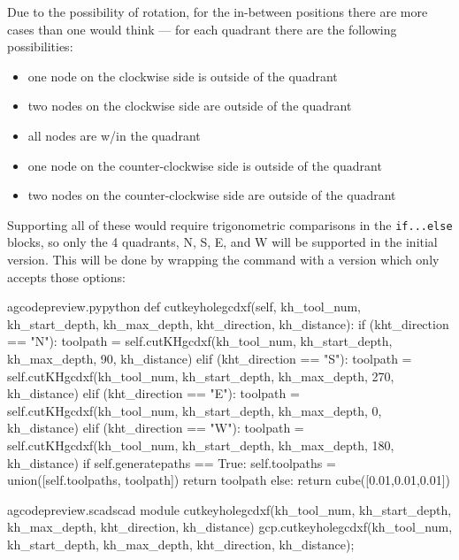 \documentclass{ltxdoc}
\begin{document}
Due to the possibility of rotation, for the in-between positions there are more cases than one would think --- for each quadrant there are the following possibilities:

\begin{itemize}
 \item one node on the clockwise side is outside of the quadrant
 \item two nodes on the clockwise side are outside of the quadrant
 \item all nodes are w/in the quadrant
 \item one node on the counter-clockwise side is outside of the quadrant
 \item two nodes on the counter-clockwise side are outside of the quadrant
\end{itemize}
 
Supporting all of these would require trigonometric comparisons in the \verb|if...else| blocks, so only the 4 quadrants, N, S, E, and W will be supported in the initial version. This will be done by wrapping the command with a version which only accepts those options: 

\lstset{firstnumber=\thegcpy}
\begin{writecode}{a}{gcodepreview.py}{python}
    def cutkeyholegcdxf(self, kh_tool_num, kh_start_depth, kh_max_depth, kht_direction, kh_distance):   
        if (kht_direction == "N"): 
            toolpath = self.cutKHgcdxf(kh_tool_num, kh_start_depth, kh_max_depth, 90, kh_distance)
        elif (kht_direction == "S"):
            toolpath = self.cutKHgcdxf(kh_tool_num, kh_start_depth, kh_max_depth, 270, kh_distance)
        elif (kht_direction == "E"):
            toolpath = self.cutKHgcdxf(kh_tool_num, kh_start_depth, kh_max_depth, 0, kh_distance)
        elif (kht_direction == "W"):
            toolpath = self.cutKHgcdxf(kh_tool_num, kh_start_depth, kh_max_depth, 180, kh_distance)
        if self.generatepaths == True:
            self.toolpaths = union([self.toolpaths, toolpath])
            return toolpath
        else:
            return cube([0.01,0.01,0.01])

\end{writecode}
\addtocounter{gcpy}{14}

\begin{writecode}{a}{gcodepreview.scad}{scad}
module cutkeyholegcdxf(kh_tool_num, kh_start_depth, kh_max_depth, kht_direction, kh_distance){
    gcp.cutkeyholegcdxf(kh_tool_num, kh_start_depth, kh_max_depth, kht_direction, kh_distance);
}

\end{writecode}
\addtocounter{gcpscad}{4}
\end{document}
